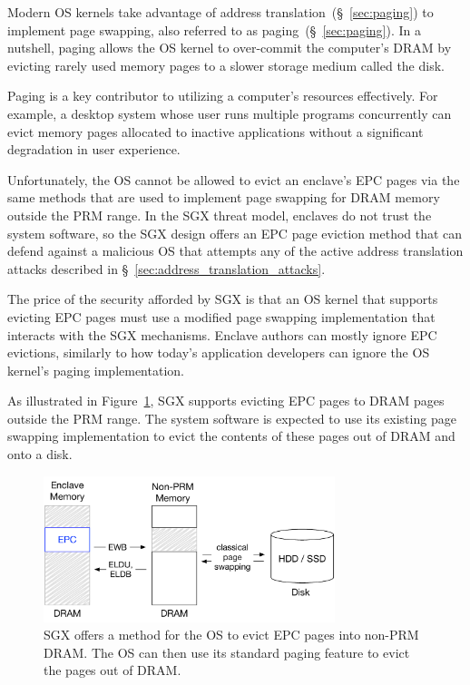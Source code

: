 \label{sec:sgx_epc_eviction}

Modern OS kernels take advantage of address translation~(\S~\ref{sec:paging})
to implement page swapping, also referred to as paging~(\S~\ref{sec:paging}).
In a nutshell, paging allows the OS kernel to over-commit the computer's DRAM
by evicting rarely used memory pages to a slower storage medium called the disk.

Paging is a key contributor to utilizing a computer's resources effectively.
For example, a desktop system whose user runs multiple programs concurrently
can evict memory pages allocated to inactive applications without a significant
degradation in user experience.

Unfortunately, the OS cannot be allowed to evict an enclave's EPC pages via the
same methods that are used to implement page swapping for DRAM memory outside
the PRM range. In the SGX threat model, enclaves do not trust the system
software, so the SGX design offers an EPC page eviction method that can defend
against a malicious OS that attempts any of the active address translation
attacks described in \S~\ref{sec:address_translation_attacks}.

The price of the security afforded by SGX is that an OS kernel that supports
evicting EPC pages must use a modified page swapping implementation that
interacts with the SGX mechanisms. Enclave authors can mostly ignore EPC
evictions, similarly to how today's application developers can ignore the OS
kernel's paging implementation.

As illustrated in Figure~\ref{fig:sgx_page_eviction}, SGX supports evicting
EPC pages to DRAM pages outside the PRM range. The system software is expected
to use its existing page swapping implementation to evict the contents of these
pages out of DRAM and onto a disk.

\begin{figure}[hbt]
  \centering
  \includegraphics[width=85mm]{figures/sgx_page_eviction.pdf}
  \caption{
    SGX offers a method for the OS to evict EPC pages into non-PRM DRAM. The
    OS can then use its standard paging feature to evict the pages out of DRAM.
  }
  \label{fig:sgx_page_eviction}
\end{figure}

